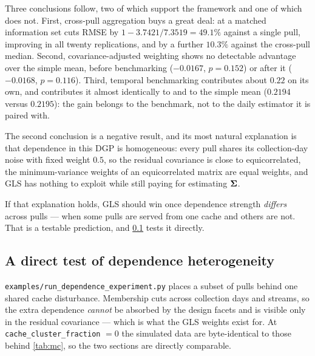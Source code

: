 \documentclass[12pt,a4paper,oneside]{article}
\begin{document}
Three conclusions follow, two of which support the framework and one of which
does not. First, cross-pull aggregation buys a great deal: at a matched
information set \RACER{} cuts RMSE by $1-3.7421/7.3519=49.1\%$ against a single
pull, improving in all twenty replications, and by a further $10.3\%$ against
the cross-pull median. Second, covariance-adjusted weighting shows no detectable
advantage over the simple mean, before benchmarking ($-0.0167$, $p=0.152$) or
after it ($-0.0168$, $p=0.116$). Third, temporal benchmarking contributes about
$0.22$ on its own, and contributes it almost identically to \RACER{} and to the
simple mean ($0.2194$ versus $0.2195$): the gain belongs to the benchmark, not
to the daily estimator it is paired with.

\begin{remark}\label{rem:prediction}
The second conclusion is a negative result, and its most natural explanation is
that dependence in this DGP is homogeneous: every pull shares its collection-day
noise with fixed weight $0.5$, so the residual covariance is close to
equicorrelated, the minimum-variance weights of an equicorrelated matrix are
equal weights, and GLS has nothing to exploit while still paying for estimating
$\bm{\Sigma}$.

If that explanation holds, GLS should win once dependence strength \emph{differs}
across pulls --- when some pulls are served from one cache and others are not.
That is a testable prediction, and \cref{sec:depexp} tests it directly.
\end{remark}

\subsection{A direct test of dependence heterogeneity}\label{sec:depexp}

\texttt{examples/run\_dependence\_experiment.py} places a subset of pulls behind
one shared cache disturbance. Membership cuts across collection days and streams,
so the extra dependence \emph{cannot} be absorbed by the design facets and is
visible only in the residual covariance --- which is what the GLS weights exist
for. At \texttt{cache\_cluster\_fraction} $=0$ the simulated data are byte-identical
to those behind \cref{tab:mc}, so the two sections are directly comparable.
\end{document}
